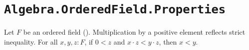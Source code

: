 \section{\texttt{Algebra.OrderedField.Properties}}


\begin{lemma}
  \label{mulCancelRLt}
  Let $F$ be an ordered field (). Multiplication by a positive element reflects strict inequality. For all $x, y, z : F$, if $0 < z$ and $x \cdot z < y \cdot z$, then $x < y$.
\end{lemma}
